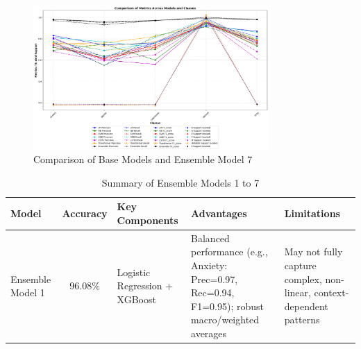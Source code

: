 \begin{figure}[h!]  
    \centering
    \includegraphics[width=0.8\textwidth]{Images/EM T RESULT.png}  
    \caption*{Comparison of Base Models and Ensemble Model 7}
    \label{lstm arch}  %
\end{figure}

\begin{table}[H]
    \centering
    \caption*{Summary of Ensemble Models 1 to 7}
    \label{tab:ensemble_comparison}
    \begin{tabularx}{\textwidth}{|l|c|X|X|X|}
    \hline
    \textbf{Model} & \textbf{Accuracy} & \textbf{Key Components} & \textbf{Advantages} & \textbf{Limitations} \\
    \hline
    Ensemble Model 1 & 96.08\% & Logistic Regression + XGBoost & Balanced performance (e.g., Anxiety: Prec=0.97, Rec=0.94, F1=0.95); robust macro/weighted averages & May not fully capture complex, non-linear, context-dependent patterns \\
    \hline
\end{tabularx}
\end{table}

\pagebreak

